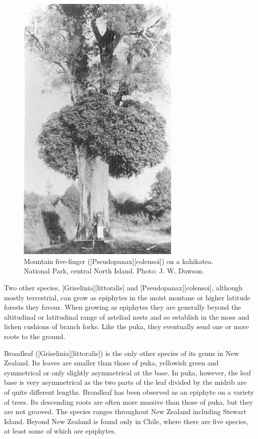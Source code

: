 \begin{figure}[htb]
\begin{minipage}[t]{0.567\textwidth}
    	\includegraphics[width=0.7\textwidth]{graphics/figure49fivefinger.jpg}
    	\caption[Mountain five-finger on a kahikatea]{Mountain five-finger ([Pseudopanax][colensoi]) on a kahikatea.
        National Park, central North Island.
    	Photo: J. W. Dawson.}%
    	\label{fig:49fivefinger}
	\end{minipage}
\end{figure}

Two other species, [Griselinia][littoralis] and [Pseudopanax][colensoi], although mostly terrestrial, can grow as epiphytes in the moist montane or higher latitude forests they favour.
When growing as epiphytes they are generally beyond the altitudinal or latitudinal range of asteliad nests and so establish in the moss and lichen cushions of branch forks.
Like the puka, they eventually send one or more roots to the ground.

Broadleaf ([Griselinia][littoralis]) is the only other species of its genus in New Zealand.
Its leaves are smaller than those of puka, yellowish green and symmetrical or only slightly asymmetrical at the base.
In puka, however, the leaf base is very asymmetrical as the two parts of the leaf divided by the midrib are of quite different lengths.
Broadleaf has been observed as an epiphyte on a variety of trees.
Its descending roots are often more massive than those of puka, but they are not grooved.
The species ranges throughout New Zealand including Stewart Island.
Beyond New Zealand  is found only in Chile, where there are five species, at least some of which are epiphytes.

